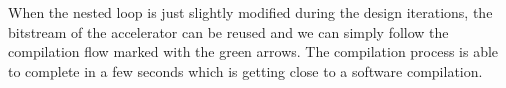 When the nested loop is just slightly modified during the design iterations, 
the bitstream of the accelerator can be reused and we can simply follow 
the compilation flow marked with the green arrows. The compilation process 
is able to complete in a few seconds which is getting close to a 
software compilation.


